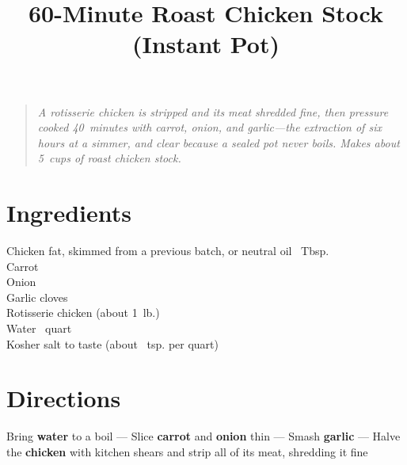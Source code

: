 \documentclass[11pt,letterpaper]{article}
\title{60-Minute Roast Chicken Stock (Instant Pot)}
\author{}
\date{}
\begin{document}
\maketitle
\thispagestyle{empty}

\begin{quote}\textit{A rotisserie chicken is stripped and its meat shredded fine, then pressure cooked \textit{40~minutes} with carrot, onion, and garlic---the extraction of six hours at a simmer, and clear because a sealed pot never boils. Makes about 5~cups of roast chicken stock.}\end{quote}

\section*{Ingredients}
\setlength{\columnsep}{20pt}
\noindent
    Chicken fat, skimmed from a previous batch, or neutral oil ~Tbsp. \\
    Carrot \dotfill {} \\
    Onion \dotfill {} \\
    Garlic cloves  \\
    Rotisserie chicken \dotfill {} (about 1~lb.) \\
    Water ~quart \\
    Kosher salt \dotfill to taste (about ~tsp. per quart) \\

\section*{Directions}

\noindent
Bring \textbf{water} to a boil ---
Slice \textbf{carrot} and \textbf{onion} thin ---
Smash \textbf{garlic} ---
Halve the \textbf{chicken} with kitchen shears and strip all of its meat, shredding it fine
\end{document}
